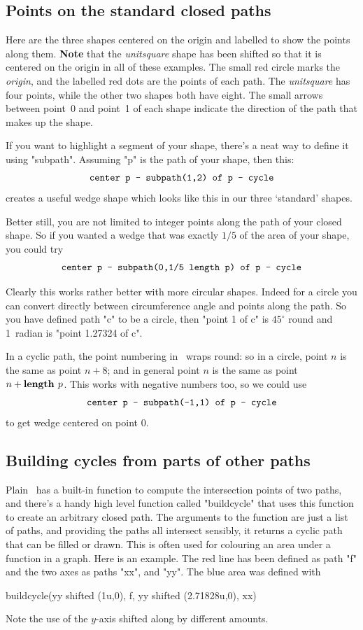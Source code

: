 \documentclass[a4paper,landscape]{article}
\def\mpic#1#2{\vadjust{\moveright5.5in\vbox to 0pt{\hsize4in\vskip#1\centerline{\texttt{[image: \#2]}}\vss}}}
\begin{document}
\newpage\subsection{Points on the standard closed paths}\noindent\mpic{-10pt}{closed1}%
Here are the three shapes centered on the origin and labelled to show the points
along them.  \textbf{Note} that the \textit{unitsquare} shape has been shifted so that it is
centered on the origin in all of these examples.  The small red circle marks the
\textit{origin}, and the labelled red dots are the points of each path.  The
\textit{unitsquare} has four points, while the other two shapes both have eight.
The small
arrows between point~0 and point~1 of each shape indicate the direction of the path
that makes up the shape.  

\vfill\noindent
If you want to highlight a segment of your shape, there’s a neat way to define it
using "subpath".  Assuming "p" is the path of your shape, then this:
$$\hbox{\ttfamily center p -- subpath(1,2) of p -- cycle}$$
creates a useful wedge shape which looks like this in our three ‘standard’
shapes.

\vfill\noindent
Better still, you are not limited to integer points along the path of your closed shape.
So if you wanted a wedge that was exactly $1/5$ of the area of your shape, you
could try
$$\hbox{\ttfamily center p -- subpath(0,1/5 length p) of p -- cycle}$$

Clearly this works rather better with more circular shapes.  Indeed for a circle you
can convert directly between circumference angle and points along the path.  So
you have defined path "c" to be a circle, then
"point 1 of c" is $45^\circ$ round and 1~radian is "point 1.27324 of c".

\vfill\noindent
In a cyclic path, the point numbering in \MP\ wraps round: so in a
circle, point $n$ is the same as point $n+8$; and in general point $n$ is the same as
point $n+\hbox{\bf length }p$.  This works with negative numbers too, so we could use 
$$\hbox{\ttfamily center p -- subpath(-1,1) of p -- cycle}$$
to get wedge centered on point 0.

\newpage\subsection{Building cycles from parts of other paths}

Plain \MP\ has a built-in function to compute the intersection points of two paths, and
there’s a handy high level function called "buildcycle" that uses this function to
create an arbitrary closed path.  
\mpic{0pt}{area-under-graph1}
The arguments to the function are just a list of paths, and providing the paths all
intersect sensibly, it
returns a cyclic path that can be filled or drawn.  This is often used for colouring an
area under a function in a graph.
Here is an example. The red line has been defined
as path "f" and the two axes as paths "xx", and "yy".  The blue area was defined
with
\begin{code}
buildcycle(yy shifted (1u,0), f, yy shifted (2.71828u,0), xx)
\end{code}
Note the use of the $y$-axis shifted along by different amounts.
\end{document}
